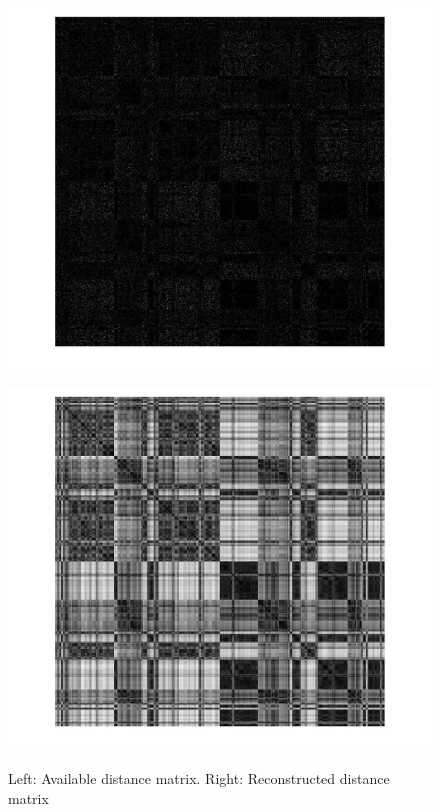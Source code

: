 \documentclass[letter,10pt]{article}
\begin{document}
\begin{figure}[H]
\centering
\begin{minipage}{0.495\linewidth}
\includegraphics[width=1\linewidth]{before_dist.jpg}\\
\end{minipage}\hfill
\begin{minipage}{0.495\linewidth}
\includegraphics[width=1\linewidth]{after_dist.jpg}\\
\end{minipage}\hfill
\caption{Left: Available distance matrix. Right: Reconstructed distance matrix}
\end{figure}
\end{document}
